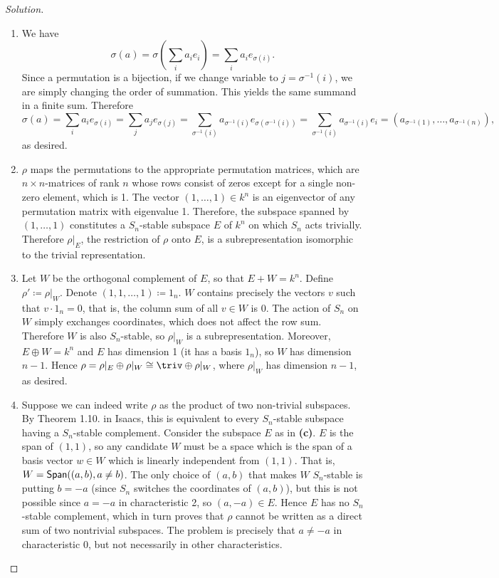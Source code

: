 \begin{proof}[Solution]
\hfill
\begin{enumerate}[font=\normalfont,label=\textbf{(\alph*)}, wide]

\item We have 
\[
\sigma(a) = \sigma\left( \sum_i a_ie_i \right) = \sum_i a_i e_{\sigma(i)}.
\]
Since a permutation is a bijection, if we change variable to $j = \sigma^{-1}(i)$, we are simply changing the order of summation. This yields the same summand in a finite sum. Therefore
\[
\sigma(a) = \sum_i a_i e_{\sigma(i)} = \sum_j a_j e_{\sigma(j)} = \sum_{\sigma^{-1}(i)} a_{\sigma^{-1}(i)} e_{\sigma(\sigma^{-1}(i))} = \sum_{\sigma^{-1}(i)} a_{\sigma^{-1}(i)} e_{i} = (a_{\sigma^{-1}(1)}, \ldots , a_{\sigma^{-1}(n)}), 
\]
as desired.

\item $\rho$ maps the permutations to the appropriate permutation matrices, which are $n\times n$-matrices of rank $n$ whose rows consist of zeros except for a single non-zero element, which is 1. The vector $(1, \ldots, 1) \in k^n$ is an eigenvector of any permutation matrix with eigenvalue 1. Therefore, the subspace spanned by $(1, \ldots, 1)$ constitutes a $S_n$-stable subspace $E$ of $k^n$ on which $S_n$ acts trivially. Therefore $\rho |_E$, the restriction of $\rho$ onto $E$, is a subrepresentation isomorphic to the trivial representation. 
\item Let $W$ be the orthogonal complement of $E$, so that $E + W = k^n$. Define $\rho' \coloneqq \rho |_W$. Denote $(1, 1, \ldots, 1) \coloneqq 1_n$. $W$ contains precisely the vectors $v$ such that $v\cdot 1_n = 0$, that is, the column sum of all $v\in W$ is 0. The action of $S_n$ on $W$ simply exchanges coordinates, which does not affect the row sum. Therefore $W$ is also $S_n$-stable, so $\rho |_W$ is a subrepresentation. Moreover, $E \oplus W = k^n$ and $E$ has dimension 1 (it has a basis $1_n$), so $W$ has dimension $n-1$. Hence $\rho = \rho |_E \oplus \rho |_W \cong \triv \oplus \rho|_W$, where $\rho|_W$ has dimension $n-1$, as desired.

\item Suppose we can indeed write $\rho$ as the product of two non-trivial subspaces. By Theorem 1.10. in Isaacs, this is equivalent to every $S_n$-stable subspace having a $S_n$-stable complement. Consider the subspace $E$ as in \textbf{(c)}. $E$ is the span of $(1, 1)$, so any candidate $W$ must be a space which is the span of a basis vector $w \in W$ which is linearly independent from $(1, 1)$. That is, $W = \mathsf{Span}((a, b), a \neq b)$. The only choice of $(a, b)$ that makes $W$ $S_n$-stable is putting $b= -a$ (since $S_n$ switches the coordinates of $(a, b)$), but this is not possible since $a = -a$ in characteristic 2, so $(a, -a) \in E$. Hence $E$ has no $S_n$-stable complement, which in turn proves that $\rho$ cannot be written as a direct sum of two nontrivial subspaces. The problem is precisely that $a \neq -a$ in characteristic 0, but not necessarily in other characteristics.


\end{enumerate}
\end{proof}
